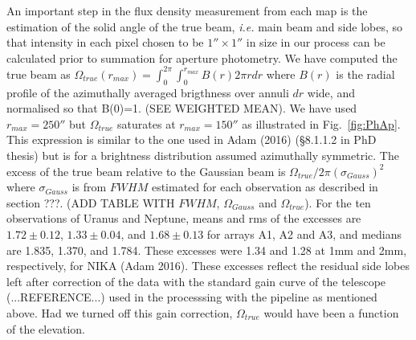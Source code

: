 An important step in the flux density measurement from each map is the estimation of the solid angle of the true beam, {\it i.e.} main beam
and side lobes, so that intensity in each pixel chosen to be $1'' \times 1''$ in size in our process can be calculated prior to summation for
aperture photometry. We have computed the true beam as $ \Omega_{true} (r_{max}) = \int_0^{2\pi} \int_0^{r_{max}} B(r) 2 \pi r dr$ where
$B(r)$ is the radial profile of the azimuthally averaged brigthness over annuli $dr$ wide, and normalised so that B(0)=1.
(SEE WEIGHTED MEAN). We have used  $r_{max}=250''$ but  $ \Omega_{true}$ saturates at $r_{max}=150''$ as illustrated
in Fig.~\ref{fig:PhAp}. This expression is similar
to the one used in Adam (2016)  (\S 8.1.1.2 in PhD thesis) but is for a  brightness distribution assumed azimuthally symmetric. 
The excess
of the true beam relative to the Gaussian beam is $\Omega_{true} / 2 \pi (\sigma_{Gauss})^2$ where  $\sigma_{Gauss}$ is from
$FWHM$ estimated for each observation as described in section ???.  (ADD TABLE WITH $FWHM$, $\Omega_{Gauss}$ and $\Omega_{true}$).
For the ten observations of Uranus and Neptune, means and rms of the excesses
are $1.72 \pm 0.12 $, $ 1.33 \pm 0.04$, and $1.68\pm 0.13 $ for arrays A1, A2 and A3, and medians are 1.835, 1.370, and 1.784.
These excesses were 1.34 and 1.28 at 1mm and 2mm, respectively, for NIKA (Adam 2016). These excesses reflect  the
residual side lobes left after correction of the data with the standard gain curve of the telescope (...REFERENCE...) used in the processsing 
with the pipeline as mentioned above. Had we turned off this gain correction,  $\Omega_{true}$ would have been a function of the
elevation.



